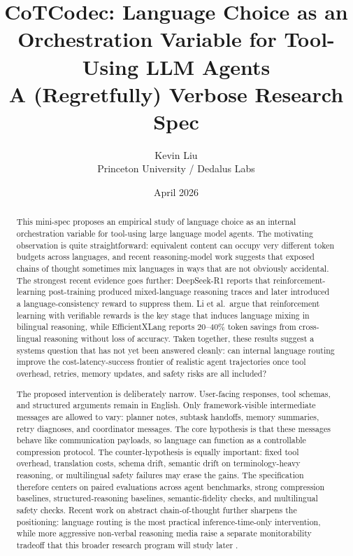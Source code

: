 \documentclass[11pt]{article}
\title{\vspace{-1.5em}\textbf{CoTCodec: Language Choice as an Orchestration Variable for Tool-Using LLM Agents}\\[0.35em]\large A (Regretfully) Verbose Research Spec}
\author{Kevin Liu\\Princeton University / Dedalus Labs}
\date{April 2026}
\begin{document}
\maketitle

\begin{abstract}
This mini-spec proposes an empirical study of language choice as an internal orchestration variable for tool-using large language model agents. The motivating observation is quite straightforward: equivalent content can occupy very different token budgets across languages, and recent reasoning-model work suggests that exposed chains of thought sometimes mix languages in ways that are not obviously accidental. The strongest recent evidence goes further: DeepSeek-R1 reports that reinforcement-learning post-training produced mixed-language reasoning traces and later introduced a language-consistency reward to suppress them. Li et al.\ argue that reinforcement learning with verifiable rewards is the key stage that induces language mixing in bilingual reasoning, while EfficientXLang reports 20--40\% token savings from cross-lingual reasoning without loss of accuracy. Taken together, these results suggest a systems question that has not yet been answered cleanly: can internal language routing improve the cost-latency-success frontier of realistic agent trajectories once tool overhead, retries, memory updates, and safety risks are all included?

The proposed intervention is deliberately narrow. User-facing responses, tool schemas, and structured arguments remain in English. Only framework-visible intermediate messages are allowed to vary: planner notes, subtask handoffs, memory summaries, retry diagnoses, and coordinator messages. The core hypothesis is that these messages behave like communication payloads, so language can function as a controllable compression protocol. The counter-hypothesis is equally important: fixed tool overhead, translation costs, schema drift, semantic drift on terminology-heavy reasoning, or multilingual safety failures may erase the gains. The specification therefore centers on paired evaluations across agent benchmarks, strong compression baselines, structured-reasoning baselines, semantic-fidelity checks, and multilingual safety checks. Recent work on abstract chain-of-thought further sharpens the positioning: language routing is the most practical inference-time-only intervention, while more aggressive non-verbal reasoning media raise a separate monitorability tradeoff that this broader research program will study later \cite{ramji2026abstractcot,baker2025monitoring,metr2025cotinformative}.
\end{abstract}
\end{document}
